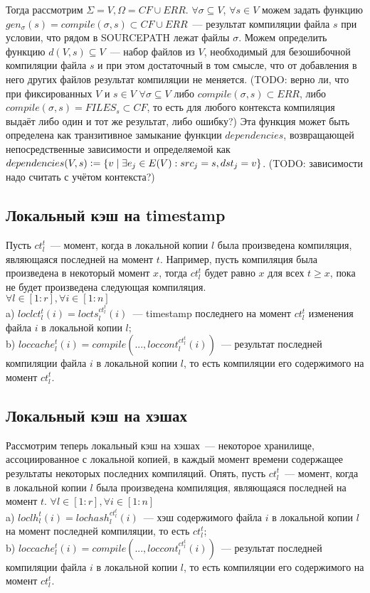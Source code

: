 Тогда рассмотрим $\Sigma = V, \Omega = CF \cup ERR$. $\forall \sigma \subseteq V$, $\forall s \in V$ можем задать функцию $gen_\sigma(s) = \textit{compile}(\sigma, s) \subset CF \cup ERR$~--- результат компиляции файла $s$ при условии, что рядом в SOURCEPATH лежат файлы $\sigma$. Можем определить функцию $d(V,s) \subseteq V$~--- набор файлов из $V$, необходимый для безошибочной компиляции файла $s$ и при этом достаточный в том смысле, что от добавления в него других файлов результат компиляции не меняется. (TODO: верно ли, что при фиксированных $V$ и $s \in V$ $\forall \sigma \subseteq V$ либо $\textit{compile}(\sigma, s) \subset ERR$, либо $\textit{compile}(\sigma, s) = FILES_s \subset CF$, то есть для любого контекста компиляция выдаёт либо один и тот же результат, либо ошибку?) Эта функция может быть определена как транзитивное замыкание функции $dependencies$, возвращающей непосредственные зависимости и определяемой как $dependencies(V,s) \vcentcolon= \{v \mid \exists e_j \in E(V): src_j = s, dst_j = v\}$. (TODO: зависимости надо считать с учётом контекста?)

\subsection{Локальный кэш на timestamp}

Пусть $ct_l^t$~--- момент, когда в локальной копии $l$ была произведена компиляция, являющаяся последней на момент $t$. Например, пусть компиляция была произведена в некоторый момент $x$, тогда $ct_l^t$ будет равно $x$ для всех $t \geqslant x$, пока не будет произведена следующая компиляция.\\
$\forall l \in [1:r], \forall i \in [1:n]$\\
\indent a) $loclct_l^t(i) = locts_l^{ct_l^t}(i)$~--- timestamp последнего на момент $ct_l^t$ изменения файла $i$ в локальной копии $l$;\\
\indent b) $loccache_l^t(i) = compile(..., loccont_l^{ct_l^t}(i))$~--- результат последней компиляции файла $i$ в локальной копии $l$, то есть компиляции его содержимого на момент $ct_l^t$.\\

\subsection{Локальный кэш на хэшах}

Рассмотрим теперь локальный кэш на хэшах~--- некоторое хранилище, ассоциированное с локальной копией, в каждый момент времени содержащее результаты некоторых последних компиляций. Опять, пусть $ct_l^t$~--- момент, когда в локальной копии $l$ была произведена компиляция, являющаяся последней на момент $t$.
$\forall l \in [1:r], \forall i \in [1:n]$\\
\indent a) $loclh_l^t(i) = lochash_l^{ct_l^t}(i)$~--- хэш содержимого файла $i$ в локальной копии $l$ на момент последней компиляции, то есть $ct_l^t$;\\
\indent b) $loccache_l^t(i) = compile(..., loccont_l^{ct_l^t}(i))$~--- результат последней компиляции файла $i$ в локальной копии $l$, то есть компиляции его содержимого на момент $ct_l^t$.\\

